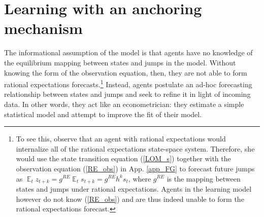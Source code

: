 \documentclass[11pt]{article}
\renewcommand{\[}{\begin{equation}}
\renewcommand{\]}{\end{equation}}
\DeclareMathOperator{\E}{\mathbb{E}}
\begin{document}
\section{Learning with an anchoring mechanism}\label{learning}
The informational assumption of the model is that agents have no knowledge of the equilibrium mapping between states and jumps in the model. Without knowing the form of the observation equation, then, they are not able to form rational expectations forecasts.\footnote{To see this, observe that an agent with rational expectations would internalize all of the rational expectations state-space system. Therefore, she would use the state transition equation (\ref{LOM_s}) together with the observation equation (\ref{RE_obs}) in App. \ref{app_FG} to forecast future jumps as $\E_t z_{t+k} = g^{RE}\E_ts_{t+k} = g^{RE}h^{k}s_t$, where $g^{RE}$ is the mapping between states and jumps under rational expectations. Agents in the learning model however do not know (\ref{RE_obs}) and are thus indeed unable to form the rational expectations forecast.} Instead, agents postulate an ad-hoc forecasting relationship between states and jumps and seek to refine it in light of incoming data. In other words, they act like an econometrician: they estimate a simple statistical model and attempt to improve the fit of their model.
\end{document}
